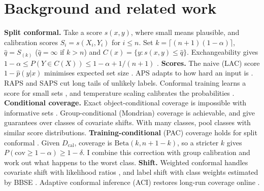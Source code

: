 \documentclass{article}
\newcommand{\dcal}{D_\text{cal}}
\newcommand{\cov}{\mathrm{cov}}
\begin{document}
\section{Background and related work}
\textbf{Split conformal.} Take a score $s(x,y)$, where small means plausible, and calibration scores $S_i=s(X_i,Y_i)$ for $i\le n$.
Set $k=\lceil(n+1)(1-\alpha)\rceil$, $\hat q=S_{(k)}$ ($\hat q=\infty$ if $k>n$) and $C(x)=\{y:s(x,y)\le\hat q\}$. Exchangeability gives
$1-\alpha\le P(Y\in C(X))\le 1-\alpha+1/(n+1)$ \citep{vovk2005algorithmic,lei2018distribution}.
\textbf{Scores.} The naive (LAC) score $1-\hat p(y|x)$ minimises expected set size \citep{sadinle2019least}. APS adapts to how hard
an input is \citep{romano2020classification}. RAPS \citep{angelopoulos2021uncertainty} and SAPS \citep{huang2024saps} cut long tails
of unlikely labels. Conformal training learns a score for small sets \citep{stutz2022learning}, and temperature scaling calibrates the
probabilities \citep{guo2017calibration}.
\textbf{Conditional coverage.} Exact object-conditional coverage is impossible with informative sets
\citep{vovk2012conditional,barber2021limits}. Group-conditional (Mondrian) coverage is achievable, and \citet{gibbs2023conformal} give
guarantees over classes of covariate shifts. With many classes, \citet{ding2023class} pool classes with similar score distributions.
\textbf{Training-conditional} (PAC) coverage holds for split conformal \citep{vovk2012conditional,bian2023training}. Given $\dcal$,
coverage is $\mathrm{Beta}(k,n+1-k)$, so a stricter $k$ gives $P(\cov\ge1-\alpha)\ge1-\delta$. I combine this correction with group
calibration and work out what happens to the worst class.
\textbf{Shift.} Weighted conformal handles covariate shift with likelihood ratios \citep{tibshirani2019conformal}, and label shift with
class weights \citep{podkopaev2021distribution} estimated by BBSE \citep{lipton2018detecting}. Adaptive conformal inference (ACI)
restores long-run coverage online \citep{gibbs2021adaptive}.

\end{document}
